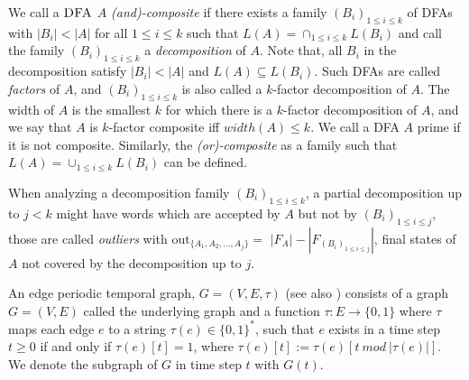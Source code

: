 We call a $\textsc{DFA}$ $A$ \textit{(and)-composite} if there exists a family $(B_i)_{1 \leq i \leq k}$ of DFAs with $|B_i| < |A|$ for all $1 \leq i \leq k$ such that $L(A) = \cap_{1\leq i \leq k} L(B_i)$ and call the family $(B_i)_{1\leq i \leq k}$ a \textit{decomposition} of $A$. Note that, all $B_i$ in the decomposition satisfy $|B_i| < |A|$ and $L(A) \subseteq L(B_i)$. Such DFAs are called \textit{factors} of $A$, and $(B_i)_{1\leq i \leq k}$ is also called a $k$-factor decomposition of $A$. The
width of $A$ is the smallest $k$ for which there is a $k$-factor decomposition of $A$, and we say that $A$ is $k$-factor composite iff $width(A) \leq k$. We call a DFA $A$ prime if it is not composite. Similarly, the \textit{(or)-composite} as a family such that  $L(A) = \cup_{1\leq i \leq k} L(B_i)$ can be defined.

When analyzing a decomposition family $(B_i)_{1 \leq i \leq k}$, a partial decomposition up to $j < k$ might have words which are accepted by $A$ but not by $(B_i)_{1 \leq i \leq j}$, those are called \textit{outliers} with $\text{out}_{\{A_1,A_2, \dots, A_j\}} = $  $|F_A| - |F_{(B_i)_{1 \leq i \leq j}}|$, final states of $A$ not covered by the decomposition up to $j$. 

An edge periodic temporal graph, $G = (V, E, \tau)$ (see also \cite{erlebach2020game}) consists of a graph $G = (V, E)$ called the underlying graph and a function $\tau : E \rightarrow \{0, 1\}$ where $\tau$ maps each edge $e$ to a string $\tau(e) \in \{0, 1\}^*$, such that $e$ exists in a time step $t \geq 0$ if and only if $\tau(e)[t] = 1$, where $\tau(e)[t] := \tau(e)[t~ mod~ |\tau(e)|]$. We denote the subgraph of $G$ in time step $t$ with $G(t)$.

